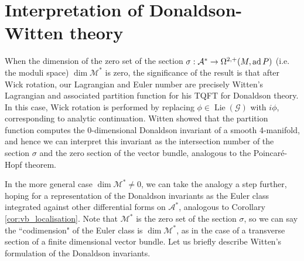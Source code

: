 \section{Interpretation of Donaldson-Witten theory}
When the dimension of the zero set 
of the section $\sigma : \mathcal{A}^* \to \Omega^{2,+}(M,\operatorname{ad} P)$ (i.e.
the moduli space) $\dim \mathcal{M}^*$ is zero, the significance of the result 
is that after Wick rotation, our Lagrangian and 
Euler number are precisely Witten's Lagrangian and associated partition function
for his TQFT for Donaldson theory.\cite{wittenTQFT} 
In this case, Wick rotation is performed by replacing 
$\phi \in \operatorname{Lie}(\mathcal{G})$ with $i\phi$, corresponding
to analytic continuation. Witten showed that the partition function computes the
0-dimensional Donaldson invariant of a smooth 4-manifold, and hence we can
interpret this invariant as the intersection number of the section $\sigma$ 
and the zero section of the vector bundle, analogous to the Poincar\'e-Hopf theorem. 

In the more general case $\dim \mathcal{M}^* \neq 0$, we can take the analogy a 
step further, hoping for a representation of the
Donaldson invariants as the Euler class integrated against
other differential forms on $\mathcal{A}^*$, analogous to Corollary
\ref{cor:vb_localisation}. Note that $\mathcal{M}^*$ is the zero set of the
section $\sigma$, so we can say the ``codimension" of the Euler class
is $\dim \mathcal{M}^*$, as in the case of a transverse section of a finite
dimensional vector bundle. Let us briefly describe Witten's formulation of the
Donaldson invariants.

